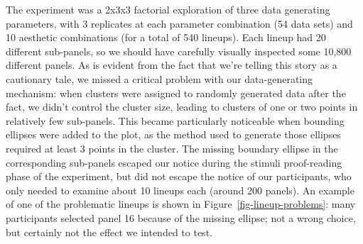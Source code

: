 \documentclass[
  10pt,
  letterpaper,
  DIV=11,
  numbers=noendperiod]{scrartcl}
\begin{document}
The experiment was a 2x3x3 factorial exploration of three data
generating parameters, with 3 replicates at each parameter combination
(54 data sets) and 10 aesthetic combinations (for a total of 540
lineups). Each lineup had 20 different sub-panels, so we should have
carefully visually inspected some 10,800 different panels. As is evident
from the fact that we're telling this story as a cautionary tale, we
missed a critical problem with our data-generating mechanism: when
clusters were assigned to randomly generated data after the fact, we
didn't control the cluster size, leading to clusters of one or two
points in relatively few sub-panels. This became particularly noticeable
when bounding ellipses were added to the plot, as the method used to
generate those ellipses required at least 3 points in the cluster. The
missing boundary ellipse in the corresponding sub-panels escaped our
notice during the stimuli proof-reading phase of the experiment, but did
not escape the notice of our participants, who only needed to examine
about 10 lineups each (around 200 panels). An example of one of the
problematic lineups is shown in Figure~\ref{fig-lineup-problems}: many
participants selected panel 16 because of the missing ellipse; not a
wrong choice, but certainly not the effect we intended to test.
\end{document}
